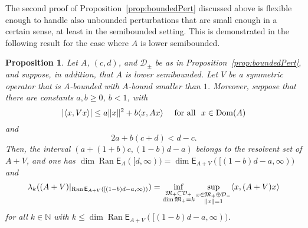 \documentclass[11pt,a4paper]{amsart}
\numberwithin{equation}{section}
\DeclareMathOperator{\Ran}{Ran}
\DeclareMathOperator{\Dom}{Dom}
\DeclarePairedDelimiter{\abs}{|}{|}
\DeclarePairedDelimiter{\norm}{\lVert}{\rVert}
\DeclarePairedDelimiter{\scprod}{\langle}{\rangle}
\newcommand{\NN}{\mathbb{N}}
\newcommand{\EE}{\mathsf{E}}
\newcommand{\cD}{{\mathcal D}}
\newcommand{\fM}{{\mathfrak M}}
\theoremstyle{plain}
\newtheorem{proposition}[theorem]{Proposition}
\theoremstyle{definition}
\theoremstyle{remark}
\begin{document}
The second proof of Proposition~\ref{prop:boundedPert} discussed above is flexible enough to handle also unbounded
perturbations that are small enough in a certain sense, at least in the semibounded setting. This is demonstrated in the
following result for the case where $A$ is lower semibounded.

\begin{proposition}\label{prop:unboundedPert}
  Let $A$, $(c,d)$, and $\cD_\pm$ be as in Proposition~\ref{prop:boundedPert}, and suppose, in addition, that $A$ is lower
  semibounded. Let $V$ be a symmetric operator that is $A$-bounded with $A$-bound smaller than $1$. Moreover, suppose that there
  are constants $a, b \ge 0$, $b < 1$, with
  \begin{equation*}
    \abs{ \scprod{ x , Vx } }
    \le
    a \norm{x}^2 + b \scprod{ x , Ax }
    \quad\text{ for all }\
    x \in \Dom(A)
  \end{equation*}
  and
  \begin{equation}\label{eq:unboundedPert}
    2a + b(c+d) < d - c.
  \end{equation}
  Then, the interval $(a+(1+b)c , (1-b)d-a)$ belongs to the resolvent set of $A+V$, and one has
  $\dim \Ran \EE_A( [d,\infty) ) = \dim \EE_{A+V}( [(1-b)d-a,\infty) )$ and
  \begin{equation*}
    \lambda_k((A+V)|_{\Ran\EE_{A+V}([(1-b)d-a,\infty))})
    =
    \inf_{\substack{\fM_+ \subset \cD_+\\ \dim\fM_+ = k}} \sup_{\substack{x\in\fM_+\oplus\cD_-\\ \norm{x}=1}}
      \scprod{ x , (A+V)x }
  \end{equation*}
  for all $k \in \NN$ with $k \le \dim\Ran \EE_{A+V}([(1-b)d-a,\infty))$.
\end{proposition}
\end{document}
